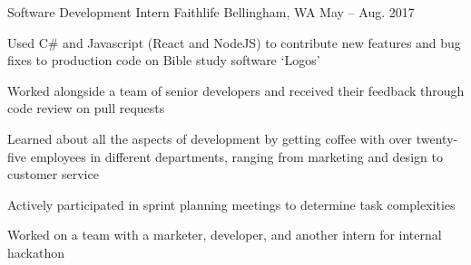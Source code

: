 

\begin{cventries}

  \cventry
    {Software Development Intern} %
    {Faithlife} %
    {Bellingham, WA} %
    {May – Aug. 2017} %
    {
      \begin{cvitems} %
        \item {Used C\# and Javascript (React and NodeJS) to contribute new features and bug fixes to production code on Bible study software `Logos'}
        \item {Worked alongside a team of senior developers and received their feedback through code review on pull requests}
        \item {Learned about all the aspects of development by getting coffee with over twenty-five employees in different departments, ranging from marketing and design to customer service}
        \item {Actively participated in sprint planning meetings to determine task complexities}
        \item {Worked on a team with a marketer, developer, and another intern for internal hackathon}
      \end{cvitems}
    }

\end{cventries}
